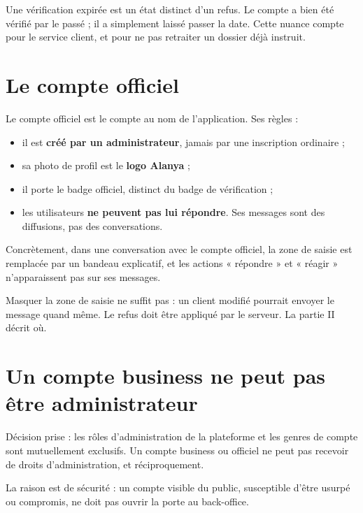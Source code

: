\begin{note}
Une vérification expirée est un état distinct d'un refus. Le compte a bien été vérifié par
le passé ; il a simplement laissé passer la date. Cette nuance compte pour le service
client, et pour ne pas retraiter un dossier déjà instruit.
\end{note}

\section{Le compte officiel}

Le compte officiel est le compte au nom de l'application. Ses règles :

\begin{itemize}[leftmargin=1.4em]
  \item il est \textbf{créé par un administrateur}, jamais par une inscription ordinaire ;
  \item sa photo de profil est le \textbf{logo Alanya} ;
  \item il porte le badge officiel, distinct du badge de vérification ;
  \item les utilisateurs \textbf{ne peuvent pas lui répondre}. Ses messages sont des
        diffusions, pas des conversations.
\end{itemize}

Concrètement, dans une conversation avec le compte officiel, la zone de saisie est
remplacée par un bandeau explicatif, et les actions « répondre » et « réagir » n'apparaissent
pas sur ses messages.

\begin{alerte}
Masquer la zone de saisie ne suffit pas : un client modifié pourrait envoyer le message
quand même. Le refus doit être appliqué par le serveur. La partie II décrit où.
\end{alerte}

\section{Un compte business ne peut pas être administrateur}

Décision prise : les rôles d'administration de la plateforme et les genres de compte sont
mutuellement exclusifs. Un compte business ou officiel ne peut pas recevoir de droits
d'administration, et réciproquement.

La raison est de sécurité : un compte visible du public, susceptible d'être usurpé ou
compromis, ne doit pas ouvrir la porte au back-office.
